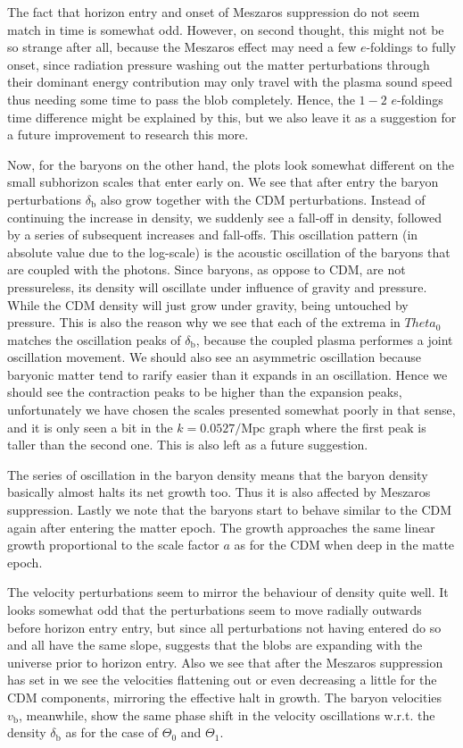 \documentclass[twocolumn]{aastex62}
\begin{document}
The fact that horizon entry and onset of Meszaros suppression do not seem match in time is somewhat odd. However, on second thought, this might not be so strange after all, because the Meszaros effect may need a few $e$-foldings to fully onset, since radiation pressure washing out the matter perturbations through their dominant energy contribution may only travel with the plasma sound speed thus needing some time to pass the blob completely. Hence, the $1-2$ $e$-foldings time difference might be explained by this, but we also leave it as a suggestion for a future improvement to research this more.   

Now, for the baryons on the other hand, the plots look somewhat different on the small subhorizon scales that enter early on. We see that after entry the baryon perturbations $\delta_\text{b}$ also grow together with the CDM perturbations. Instead of continuing the increase in density, we suddenly see a fall-off in density, followed by a series of subsequent increases and fall-offs. This oscillation pattern (in absolute value due to the log-scale) is the acoustic oscillation of the baryons that are coupled with the photons. Since baryons, as oppose to CDM, are not pressureless, its density will oscillate under influence of gravity and pressure. While the CDM density will just grow under gravity, being untouched by pressure. This is also the reason why we see that each of the extrema in $Theta_0$ matches the oscillation peaks of $\delta_\text{b}$, because the coupled plasma performes a joint oscillation movement. We should also see an asymmetric oscillation because baryonic matter tend to rarify easier than it expands in an oscillation. Hence we should see the contraction peaks to be higher than the expansion peaks, unfortunately we have chosen the scales presented somewhat poorly in that sense, and it is only seen a bit in the $k = 0.0527/\mathrm{Mpc}$ graph where the first peak is taller than the second one. This is also left as a future suggestion. 

The series of oscillation in the baryon density means that the baryon density basically almost halts its net growth too. Thus it is also affected by Meszaros suppression. Lastly we note that the baryons start to behave similar to the CDM again after entering the matter epoch. The growth approaches the same linear growth proportional to the scale factor $a$ as for the CDM when deep in the matte epoch. 

The velocity perturbations seem to mirror the behaviour of density quite well. It looks somewhat odd that the perturbations seem to move radially outwards before horizon entry entry, but since all perturbations not having entered do so and all have the same slope, suggests that the blobs are expanding with the universe prior to horizon entry. Also we see that after the Meszaros suppression has set in we see the velocities flattening out or even decreasing a little for the CDM components, mirroring the effective halt in growth. The baryon velocities $v_\text{b}$, meanwhile, show the same phase shift in the velocity oscillations w.r.t. the density $\delta_\text{b}$ as for the case of $\Theta_0$ and $\Theta_1$.  
\end{document}
